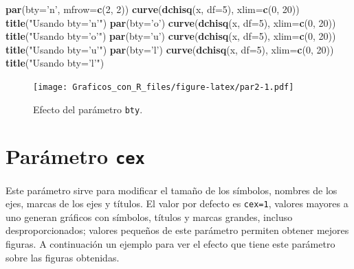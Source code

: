 \documentclass[10pt,]{krantz}
\makeatletter
\newenvironment{Shaded}{\begin{snugshade}}{\end{snugshade}}
\newcommand{\KeywordTok}[1]{\textcolor[rgb]{0.13,0.29,0.53}{\textbf{{#1}}}}
\newcommand{\DataTypeTok}[1]{\textcolor[rgb]{0.13,0.29,0.53}{{#1}}}
\newcommand{\DecValTok}[1]{\textcolor[rgb]{0.00,0.00,0.81}{{#1}}}
\newcommand{\StringTok}[1]{\textcolor[rgb]{0.31,0.60,0.02}{{#1}}}
\newcommand{\NormalTok}[1]{{#1}}
\newenvironment{kframe}{%
\medskip{}
\setlength{\fboxsep}{.8em}
 \def\at@end@of@kframe{}%
 \ifinner\ifhmode%
  \def\at@end@of@kframe{\end{minipage}}%
  \begin{minipage}{\columnwidth}%
 \fi\fi%
 \def\FrameCommand##1{\hskip\@totalleftmargin \hskip-\fboxsep
 \colorbox{shadecolor}{##1}\hskip-\fboxsep
     \hskip-\linewidth \hskip-\@totalleftmargin \hskip\columnwidth}%
 \MakeFramed {\advance\hsize-\width
   \@totalleftmargin\z@ \linewidth\hsize
   \@setminipage}}%
 {\par\unskip\endMakeFramed%
 \at@end@of@kframe}
\renewenvironment{Shaded}{\begin{kframe}}{\end{kframe}}
\makeatother
\begin{document}
\begin{Shaded}
\begin{Highlighting}[]
\KeywordTok{par}\NormalTok{(}\DataTypeTok{bty=}\StringTok{'n'}\NormalTok{, }\DataTypeTok{mfrow=}\KeywordTok{c}\NormalTok{(}\DecValTok{2}\NormalTok{, }\DecValTok{2}\NormalTok{))}
\KeywordTok{curve}\NormalTok{(}\KeywordTok{dchisq}\NormalTok{(x, }\DataTypeTok{df=}\DecValTok{5}\NormalTok{), }\DataTypeTok{xlim=}\KeywordTok{c}\NormalTok{(}\DecValTok{0}\NormalTok{, }\DecValTok{20}\NormalTok{))}
\KeywordTok{title}\NormalTok{(}\StringTok{"Usando bty='n'"}\NormalTok{)}
\KeywordTok{par}\NormalTok{(}\DataTypeTok{bty=}\StringTok{'o'}\NormalTok{)}
\KeywordTok{curve}\NormalTok{(}\KeywordTok{dchisq}\NormalTok{(x, }\DataTypeTok{df=}\DecValTok{5}\NormalTok{), }\DataTypeTok{xlim=}\KeywordTok{c}\NormalTok{(}\DecValTok{0}\NormalTok{, }\DecValTok{20}\NormalTok{))}
\KeywordTok{title}\NormalTok{(}\StringTok{"Usando bty='o'"}\NormalTok{)}
\KeywordTok{par}\NormalTok{(}\DataTypeTok{bty=}\StringTok{'u'}\NormalTok{)}
\KeywordTok{curve}\NormalTok{(}\KeywordTok{dchisq}\NormalTok{(x, }\DataTypeTok{df=}\DecValTok{5}\NormalTok{), }\DataTypeTok{xlim=}\KeywordTok{c}\NormalTok{(}\DecValTok{0}\NormalTok{, }\DecValTok{20}\NormalTok{))}
\KeywordTok{title}\NormalTok{(}\StringTok{"Usando bty='u'"}\NormalTok{)}
\KeywordTok{par}\NormalTok{(}\DataTypeTok{bty=}\StringTok{'l'}\NormalTok{)}
\KeywordTok{curve}\NormalTok{(}\KeywordTok{dchisq}\NormalTok{(x, }\DataTypeTok{df=}\DecValTok{5}\NormalTok{), }\DataTypeTok{xlim=}\KeywordTok{c}\NormalTok{(}\DecValTok{0}\NormalTok{, }\DecValTok{20}\NormalTok{))}
\KeywordTok{title}\NormalTok{(}\StringTok{"Usando bty='l'"}\NormalTok{)}
\end{Highlighting}
\end{Shaded}

\begin{figure}[htbp]
\centering
\texttt{[image: Graficos\_con\_R\_files/figure-latex/par2-1.pdf]}
\caption{\label{fig:par2}Efecto del parámetro \texttt{bty}.}
\end{figure}

\section{\texorpdfstring{Parámetro \texttt{cex}
}{Parámetro cex  }}\label{parametro-cex}

Este parámetro sirve para modificar el tamaño de los símbolos, nombres
de los ejes, marcas de los ejes y títulos. El valor por defecto es
\texttt{cex=1}, valores mayores a uno generan gráficos con símbolos,
títulos y marcas grandes, incluso desproporcionados; valores pequeños de
este parámetro permiten obtener mejores figuras. A continuación un
ejemplo para ver el efecto que tiene este parámetro sobre las figuras
obtenidas.
\end{document}
